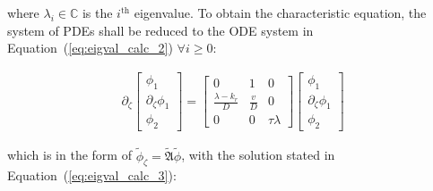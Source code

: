 
where $\lambda_i \in \mathbb{C}$ is the $i^{\text{th}}$ eigenvalue. To obtain the characteristic equation, the system of PDEs shall be reduced to the ODE system in Equation~(\ref{eq:eigval_calc_2}) $\forall i \geq 0$:

\begin{equation} \label{eq:eigval_calc_2}
    \begin{aligned}
        \partial_\zeta \begin{bmatrix}
            \phi_1 \\ \partial_\zeta \phi_1 \\ \phi_2
        \end{bmatrix} = \begin{bmatrix}
            0 & 1 & 0 \\
            \frac{\lambda-k_r}{D} & \frac{v}{D} & 0 \\
            0 & 0 & \tau \lambda 
        \end{bmatrix} \begin{bmatrix}
            \phi_1 \\ \partial_\zeta \phi_1 \\ \phi_2
        \end{bmatrix}
    \end{aligned}
\end{equation}

which is in the form of $ \tilde{\phi}_\zeta  = \tilde{\mathfrak{A}} \tilde{\phi}$, with the solution stated in Equation~(\ref{eq:eigval_calc_3}):

